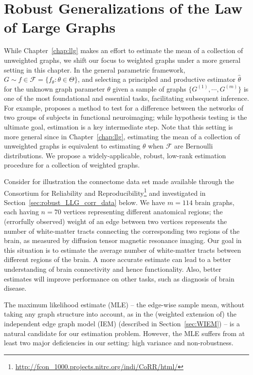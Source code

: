 
\chapter{Robust Generalizations of the Law of Large Graphs}
\label{chap:robust_llg}

While Chapter~\ref{chap:llg} makes an effort to estimate the mean of a collection of unweighted graphs, we shift our focus to weighted graphs under a more general setting in this chapter.
In the general parametric framework, $G \sim f \in \mathcal{F} = \{f_{\theta} : \theta \in \Theta \}$, and selecting a principled and productive estimator $\hat{\theta}$ for the unknown graph parameter $\theta$ given a sample of graphs $\{G^{(1)}, \cdots, G^{(m)}\}$ is one of the most foundational and essential tasks, facilitating subsequent inference.
For example, \citet{ginestet2014hypothesis} proposes a method to test for a difference between the networks of two groups of subjects in functional neuroimaging; while hypothesis testing is the ultimate goal, estimation is a key intermediate step.
Note that this setting is more general since in Chapter~\ref{chap:llg}, estimating the mean of a collection of unweighted graphs is equivalent to estimating $\theta$ when $\mathcal{F}$ are Bernoulli distributions.
We propose a widely-applicable, robust, low-rank estimation procedure for a collection of weighted graphs.

Consider for illustration the connectome data set made available through the
Consortium for Reliability and Reproducibility\footnote{\url{http://fcon_1000.projects.nitrc.org/indi/CoRR/html/}}
and investigated in Section~\ref{sec:robust_LLG_corr_data} below.
We have $m=114$ brain graphs, each having $n=70$ vertices representing different anatomical regions; the (errorfully observed) weight of an edge between two vertices represents the number of white-matter tracts connecting the corresponding two regions of the brain, as measured by diffusion tensor magnetic resonance imaging.
Our goal in this situation is to estimate the average number of white-matter tracts between different regions of the brain. A more accurate estimate can lead to a better understanding of brain connectivity and hence functionality. Also, better estimates will improve performance on other tasks, such as diagnosis of brain disease.

The maximum likelihood estimate (MLE) -- the edge-wise sample mean, without taking any graph structure into account, as in the (weighted extension of) the independent edge graph model (IEM) \citep{bollobas2007phase} (described in Section~\ref{sec:WIEM}) --
is a natural candidate for our estimation problem. However, the MLE suffers from at least two major deficiencies in our setting: high variance and non-robustness.

